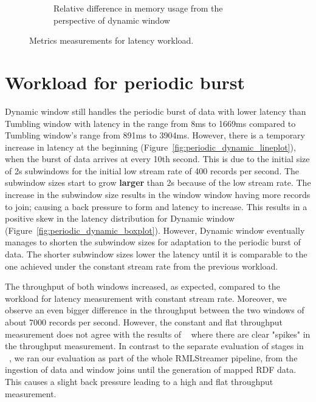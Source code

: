 \begin{figure}
\begin{subfigure}[b]{\textwidth}
        \caption{Relative difference in memory usage from the perspective of dynamic window}
        \label{fig:constant_mem_diff}
    \end{subfigure}

    \caption{Metrics measurements for latency workload.}%
    \label{fig:constant_measurement}
\end{figure}

\newpage
\section{Workload for periodic burst}%
\label{sec:Results Workload for periodic burst}

Dynamic window still handles the periodic burst of data with lower latency 
than Tumbling window with latency in the range from 8ms to 1669ms compared to 
Tumbling window's range from 891ms to 3904ms.
However, there is a temporary increase in latency at the beginning 
(Figure~\ref{fig:periodic_dynamic_lineplot}), 
when the burst of data arrives at every 10th second. 
This is due to the initial size of 2s subwindows for the initial low stream rate of 400 records per second. 
The subwindow sizes start to grow \textbf{larger} than 2s because of the low stream rate. 
The increase in the subwindow size results in the window 
window having more records to join; causing a back pressure to form and latency to increase.  
This results in a positive skew in the latency distribution for Dynamic window (Figure~\ref{fig:periodic_dynamic_boxplot}). 
However, Dynamic window eventually manages to shorten the subwindow sizes for adaptation to the periodic burst of data.
The shorter subwindow sizes lower the latency until it is comparable to the one achieved under the constant stream rate from the 
previous workload.


The throughput of both windows increased, as expected, compared to the workload for latency measurement 
with constant stream rate. Moreover, we observe an even bigger difference in the throughput between the 
two windows of about 7000 records per second. However, the
constant and flat throughput measurement does not agree 
with the results of ~\cite{evalution_of_spe} where there are clear "spikes" in the throughput measurement. In 
contrast to the separate evaluation of stages in ~\cite{evalution_of_spe}, 
we ran our evaluation as part of the whole RMLStreamer pipeline, from the 
ingestion of data and window joins until the generation of mapped RDF data. This causes a slight back pressure 
leading to a high and flat throughput measurement. 

